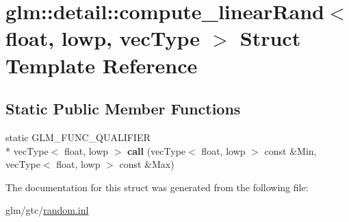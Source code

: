 \hypertarget{structglm_1_1detail_1_1compute__linearRand_3_01float_00_01lowp_00_01vecType_01_4}{\section{glm\-:\-:detail\-:\-:compute\-\_\-linear\-Rand$<$ float, lowp, vec\-Type $>$ Struct Template Reference}
\label{structglm_1_1detail_1_1compute__linearRand_3_01float_00_01lowp_00_01vecType_01_4}
}
\subsection*{Static Public Member Functions}
\begin{DoxyCompactItemize}
\item 
\hypertarget{structglm_1_1detail_1_1compute__linearRand_3_01float_00_01lowp_00_01vecType_01_4_a7fa98be90215a865635df999883a55ca}{static G\-L\-M\-\_\-\-F\-U\-N\-C\-\_\-\-Q\-U\-A\-L\-I\-F\-I\-E\-R \\*
vec\-Type$<$ float, lowp $>$ {\bfseries call} (vec\-Type$<$ float, lowp $>$ const \&Min, vec\-Type$<$ float, lowp $>$ const \&Max)}\label{structglm_1_1detail_1_1compute__linearRand_3_01float_00_01lowp_00_01vecType_01_4_a7fa98be90215a865635df999883a55ca}

\end{DoxyCompactItemize}


The documentation for this struct was generated from the following file\-:\begin{DoxyCompactItemize}
\item 
glm/gtc/\hyperlink{random_8inl}{random.\-inl}\end{DoxyCompactItemize}
